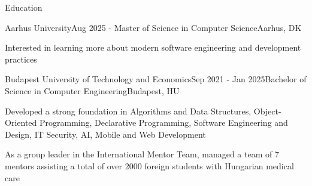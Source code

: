 \documentclass[
	a4paper, %
	11pt, %
]{resume} %
\begin{document}

\begin{rSection}{Education}

	\begin{rSubsection}{Aarhus University}{Aug 2025 - }{Master of Science in Computer Science}{Aarhus, DK}
		\item Interested in learning more about modern software engineering and development practices
	\end{rSubsection}

	\begin{rSubsection}{Budapest University of Technology and Economics}{Sep 2021 - Jan 2025}{Bachelor of Science in Computer Engineering}{Budapest, HU}
		\item Developed a strong foundation in Algorithms and Data Structures, Object-Oriented Programming, Declarative Programming, Software Engineering and Design, IT Security, AI, Mobile and Web Development
		\item As a group leader in the International Mentor Team, managed a team of 7 mentors assisting a total of over 2000 foreign students with Hungarian medical care
	\end{rSubsection}

\end{rSection}

\end{document}
